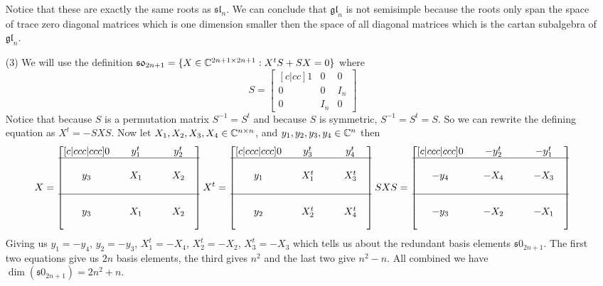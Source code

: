 \documentclass[12pt]{amsart}
\begin{document}
\begin{itemize}
    Notice that these are exactly the same roots as $\mathfrak{sl}_n$. We can conclude that 
    $\mathfrak{gl}_n$ is not semisimple because the roots only span the space of trace zero
    diagonal matrices which is one dimension smaller then the space of all diagonal matrices
    which is the cartan subalgebra of $\mathfrak{gl}_n$.\\
    \item[(3)] 
    We will use the definition $\mathfrak{s0}_{2n+1}=\{X\in \mathbb{C}^{2n+1\times 2n+1}: X^tS+SX=0\}$ where 
    \[S=\begin{bmatrix}[c|cc]
        1 &0 &0\\
        \hline
        0 &0 &I_n\\
        0 &I_n& 0
    \end{bmatrix}\]
    Notice that because $S$ is a permutation matrix $S^{-1}=S^t$ and because 
    $S$ is symmetric, $S^{-1}=S^t=S$. So we can rewrite the defining equation as $X^t=-SXS$.
    Now let $X_1,X_2,X_3,X_4\in \mathbb{C}^{n\times n}$, and $y_1,y_2,y_3,y_4\in \mathbb{C}^n$ then 
    \[X=\begin{bmatrix}[c|ccc|ccc]
        0 &&y_1^t&&&y_2^t&\\
        \hline
        &&&&&&\\
        y_3&&X_1&&&X_2&\\
        &&&&&&\\
        \hline
        &&&&&&\\
        y_3&&X_1&&&X_2&\\
        &&&&&&\\
    \end{bmatrix} X^t=\begin{bmatrix}[c|ccc|ccc]
        0 &&y_3^t&&&y_4^t&\\
        \hline
        &&&&&&\\
        y_1&&X_1^t&&&X_3^t&\\
        &&&&&&\\
        \hline
        &&&&&&\\
        y_2&&X_2^t&&&X_4^t&\\
        &&&&&&\\
    \end{bmatrix} SXS=\begin{bmatrix}[c|ccc|ccc]
        0 &&-y_2^t&&&-y_1^t&\\
        \hline
        &&&&&&\\
        -y_4&&-X_4&&&-X_3&\\
        &&&&&&\\
        \hline
        &&&&&&\\
        -y_3&&-X_2&&&-X_1&\\
        &&&&&&\\
    \end{bmatrix}\]
    Giving us $y_1=-y_4$, $y_2=-y_3$, $X_1^t=-X_4$, $X_2^t=-X_2$, $X_3^t=-X_3$ which tells 
    us about the redundant basis elements $\mathfrak{s0}_{2n+1}$. The first two equations 
    give us $2n$ basis elements, the third gives $n^2$ and the last two give $n^2-n$. All 
    combined we have $\dim(\mathfrak{s0}_{2n+1})=2n^2+n$.\\


\end{itemize}
\end{document}

